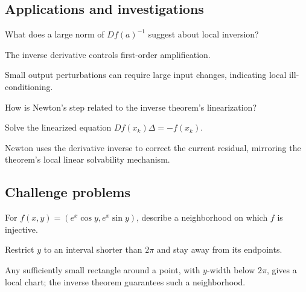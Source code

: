 \subsection*{Applications and investigations}

\begin{exercise}\label{exr:ii09-expand-13}
What does a large norm of \(Df(a)^{-1}\) suggest about local inversion?
\end{exercise}
\begin{hint}
The inverse derivative controls first-order amplification.
\end{hint}
\begin{solution}
Small output perturbations can require large input changes, indicating local ill-conditioning.
\end{solution}

\begin{exercise}\label{exr:ii09-expand-14}
How is Newton's step related to the inverse theorem's linearization?
\end{exercise}
\begin{hint}
Solve the linearized equation \(Df(x_k)\Delta=-f(x_k)\).
\end{hint}
\begin{solution}
Newton uses the derivative inverse to correct the current residual, mirroring the theorem's local linear solvability mechanism.
\end{solution}

\subsection*{Challenge problems}

\begin{exercise}\label{exr:ii09-expand-15}
For \(f(x,y)=(e^x\cos y,e^x\sin y)\), describe a neighborhood on which \(f\) is injective.
\end{exercise}
\begin{hint}
Restrict \(y\) to an interval shorter than \(2\pi\) and stay away from its endpoints.
\end{hint}
\begin{solution}
Any sufficiently small rectangle around a point, with \(y\)-width below \(2\pi\), gives a local chart; the inverse theorem guarantees such a neighborhood.
\end{solution}

